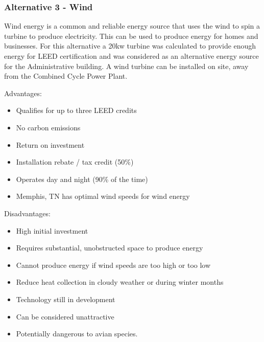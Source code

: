 \documentclass{ceri}
\begin{document}
\subsubsection{Alternative 3 - Wind}

Wind energy is a common and reliable energy source that uses the wind to spin a turbine to produce electricity. This can be used to produce energy for homes and businesses. For this alternative a 20kw turbine was calculated to provide enough energy for LEED certification and was considered as an alternative energy source for the Administrative building. A wind turbine can be installed on site, away from the Combined Cycle Power Plant.

Advantages:
\begin{itemize}
\item Qualifies for up to three LEED credits
\item No carbon emissions
\item Return on investment
\item Installation rebate / tax credit (50\%)
\item Operates day and night (90\% of the time)
\item Memphis, TN has optimal wind speeds for wind energy
\end{itemize}
Disadvantages:
\begin{itemize}
\item High initial investment
\item Requires substantial, unobstructed space to produce energy
\item Cannot produce energy if wind speeds are too high or too low
\item Reduce heat collection in cloudy weather or during winter months
\item Technology still in development
\item Can be considered unattractive
\item Potentially dangerous to avian species.
\end{itemize}

\newpage
\end{document}
